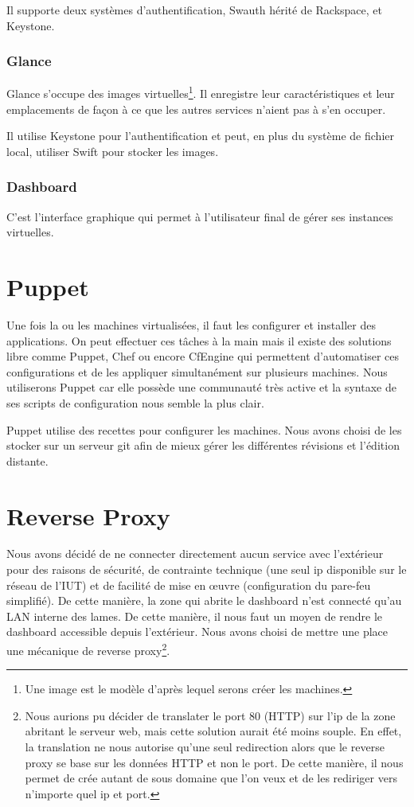 \documentclass[a4paper,oneside]{report}
\begin{document}
Il supporte deux systèmes d'authentification, Swauth hérité de Rackspace, et Keystone.

\subsubsection{Glance}
Glance s'occupe des images virtuelles\footnote{Une image est le modèle d'après lequel serons créer les machines.}.
Il enregistre leur caractéristiques et leur emplacements de façon à ce que les autres services n'aient pas à s'en occuper.

Il utilise Keystone pour l'authentification et peut, en plus du système de fichier local, utiliser Swift pour stocker les images.

\subsubsection{Dashboard}
C'est l'interface graphique qui permet à l'utilisateur final de gérer ses instances virtuelles.

\section{Puppet}
Une fois la ou les machines virtualisées, il faut les configurer et installer des applications. On peut effectuer ces tâches à la main mais il existe des solutions libre comme Puppet, Chef ou encore CfEngine qui permettent d'automatiser ces configurations et de les appliquer simultanément sur plusieurs machines.
Nous utiliserons Puppet car elle possède une communauté très active et la syntaxe de ses scripts de configuration nous semble la plus clair.

Puppet utilise des recettes pour configurer les machines.
Nous avons choisi de les stocker sur un serveur git afin de mieux gérer les différentes révisions et l'édition distante.

\section{Reverse Proxy}
Nous avons décidé de ne connecter directement aucun service avec l'extérieur pour des raisons de sécurité, de contrainte technique (une seul ip disponible sur le réseau de l'IUT) et de facilité de mise en œuvre (configuration du pare-feu simplifié).
De cette manière, la zone qui abrite le dashboard n'est connecté qu'au LAN interne des lames.
De cette manière, il nous faut un moyen de rendre le dashboard accessible depuis l'extérieur. Nous avons choisi de mettre une place une mécanique de reverse proxy\footnote{Nous aurions pu décider de translater le port 80 (HTTP) sur l'ip de la zone abritant le serveur web, mais cette solution aurait été moins souple.
En effet, la translation ne nous autorise qu'une seul redirection alors que le reverse proxy se base sur les données HTTP et non le port. De cette manière, il nous permet de crée autant de sous domaine que l'on veux et de les rediriger vers n'importe quel ip et port.}.
\end{document}
